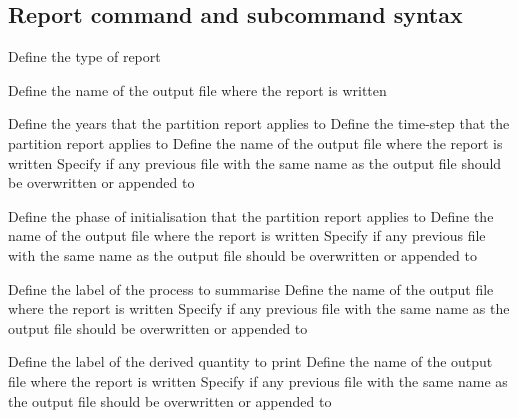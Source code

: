 \subsection{Report command and subcommand syntax}\par
{}\par\par
{} {Define the type of report}
\par\textbf{}\par
{} {Define the name of the output file where the report is written}
\par\textbf{}\par
{} {Define the years that the partition report applies to}
 {Define the time-step that the partition report applies to}
 {Define the name of the output file where the report is written}
 {Specify if any previous file with the same name as the output file should be overwritten or appended to}
\par\textbf{}\par
{} {Define the phase of initialisation that the partition report applies to}
 {Define the name of the output file where the report is written}
 {Specify if any previous file with the same name as the output file should be overwritten or appended to}
\par\textbf{}\par
{} {Define the label of the process to summarise}
 {Define the name of the output file where the report is written}
 {Specify if any previous file with the same name as the output file should be overwritten or appended to}
\par\textbf{}\par
{} {Define the label of the derived quantity to print}
 {Define the name of the output file where the report is written}
 {Specify if any previous file with the same name as the output file should be overwritten or appended to}
\par\textbf{}\par

